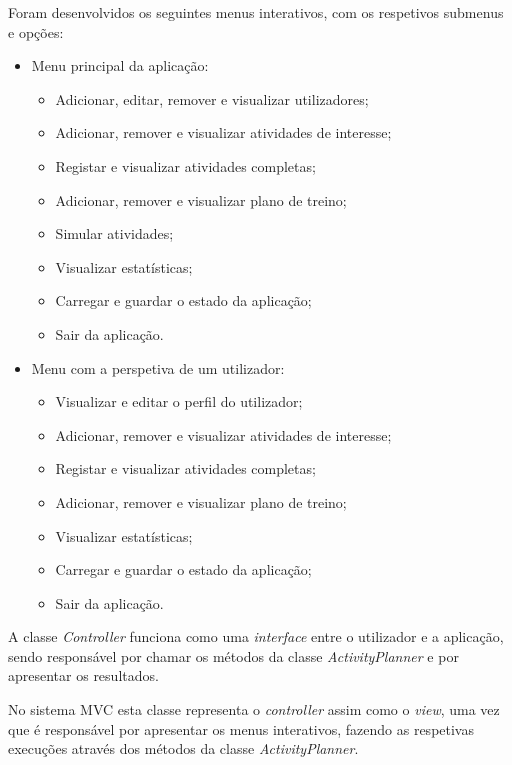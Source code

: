 \documentclass[a4paper,12pt]{scrreprt}
\begin{document}
    Foram desenvolvidos os seguintes menus interativos, com os respetivos submenus e opções:
    \begin{itemize}
        \item Menu principal da aplicação:
        \begin{itemize}
            \item Adicionar, editar, remover e visualizar utilizadores;
            \item Adicionar, remover e visualizar atividades de interesse;
            \item Registar e visualizar atividades completas;
            \item Adicionar, remover e visualizar plano de treino;
            \item Simular atividades;
            \item Visualizar estatísticas;
            \item Carregar e guardar o estado da aplicação;
            \item Sair da aplicação.
        \end{itemize}
        \item Menu com a perspetiva de um utilizador:
        \begin{itemize}
            \item Visualizar e editar o perfil do utilizador;
            \item Adicionar, remover e visualizar atividades de interesse;
            \item Registar e visualizar atividades completas;
            \item Adicionar, remover e visualizar plano de treino;
            \item Visualizar estatísticas;
            \item Carregar e guardar o estado da aplicação;
            \item Sair da aplicação.
        \end{itemize}
    \end{itemize}

    A classe \textit{Controller} funciona como uma \textit{interface} entre o utilizador e a aplicação,
    sendo responsável por chamar os métodos da classe \textit{ActivityPlanner} e por apresentar os resultados.

    No sistema MVC esta classe representa o \textit{controller} assim como o \textit{view},
    uma vez que é responsável por apresentar os menus interativos,
    fazendo as respetivas execuções através dos métodos da classe \textit{ActivityPlanner}.
\end{document}
